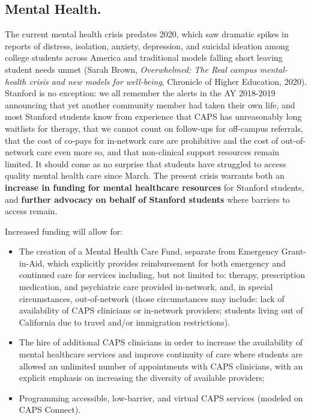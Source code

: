 \documentclass[12pt, titlepage, letterpaper]{article}
\begin{document}
\subsection*{Mental Health.}
%

The current mental health crisis predates 2020, which saw dramatic spikes in reports of distress, isolation, anxiety, depression, and suicidal ideation among college students across America and traditional models falling short leaving student needs unmet (Sarah Brown, \textit{Overwhelmed: The Real campus mental-health crisis and new models for well-being}, Chronicle of Higher Education, 2020). Stanford is no exception: we all remember the alerts in the AY 2018-2019 announcing that yet another community member had taken their own life, and most Stanford students know from experience that CAPS has unreasonably long waitlists for therapy, that we cannot count on follow-ups for off-campus referrals, that the cost of co-pays for in-network care are prohibitive and the cost of out-of-network care even more so, and that non-clinical support resources remain limited. It should come as no surprise that students have struggled to access quality mental health care since March. The present crisis warrants both an \textbf{increase in funding for mental healthcare resources} for Stanford students, and \textbf{further advocacy on behalf of Stanford students} where barriers to access remain. 

Increased funding will allow for: 
\begin{itemize}[noitemsep]
    \item The creation of a Mental Health Care Fund, separate from Emergency Grant-in-Aid, which explicitly provides reimbursement for both emergency and continued care for services including, but not limited to: therapy, prescription medication, and psychiatric care provided in-network, and, in special circumstances, out-of-network (those circumstances may include: lack of availability of CAPS clinicians or in-network providers; students living out of California due to travel and/or immigration restrictions).
    \item The hire of additional CAPS clinicians in order to increase the availability of mental healthcare services and improve continuity of care where students are allowed an unlimited number of appointments with CAPS clinicians, with an explicit emphasis on increasing the diversity of available providers;
    \item Programming accessible, low-barrier, and virtual CAPS services (modeled on CAPS Connect).
\end{itemize}
\end{document}
